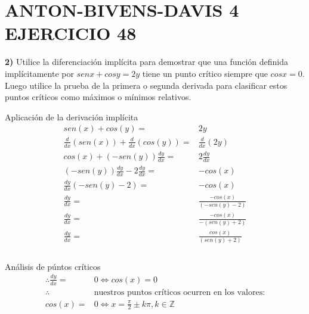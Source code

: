 \chapter*{ANTON-BIVENS-DAVIS 4 EJERCICIO 48}
\textbf{2)} Utilice la diferenciación implícita para demostrar que una función definida implícitamente por $sen x + cos y = 2y$ tiene un punto crítico siempre que $cos x = 0$. Luego utilice la prueba de la primera o segunda derivada para clasificar estos puntos críticos como máximos o mínimos relativos.

\begin{multicols}{2}
	\noindent
	Aplicación de la derivación implícita
	\begin{align*}
		sen (x)+cos(y)=                                                   & 2y                                      \\
		\frac{d}{dx}\left(sen (x)\right)+\frac{d}{dx}\left(cos(y)\right)= & \frac{d}{dx}\left(2y\right)             \\
		cos (x)+\left(-sen(y)\right)\frac{dy}{dx}=                        & 2\frac{dy}{dx}                          \\
		\left(-sen(y)\right)\frac{dy}{dx}-2\frac{dy}{dx}=                 & -cos (x)                                \\
		\frac{dy}{dx}\left(-sen(y)-2\right)=                              & -cos (x)                                \\
		\frac{dy}{dx}=                                                    & \frac{-cos (x)}{\left(-sen(y)-2\right)} \\
		\frac{dy}{dx}=                                                    & \frac{-cos (x)}{-\left(sen(y)+2\right)} \\
		\frac{dy}{dx}=                                                    & \frac{cos (x)}{\left(sen(y)+2\right)}   \\
	\end{align*}
	\columnbreak\\
	Análisis de púntos críticos
	\begin{align*}
		\therefore \frac{dy}{dx}= & 0\iff cos(x)=0                                          \\
		\therefore                & \text{nuestros puntos críticos ocurren en los valores:} \\
		cos(x)=                   & 0\iff x=\frac{\pi}{2}\pm k\pi, k\in\mathbb{Z}           \\
	\end{align*}
\end{multicols}
